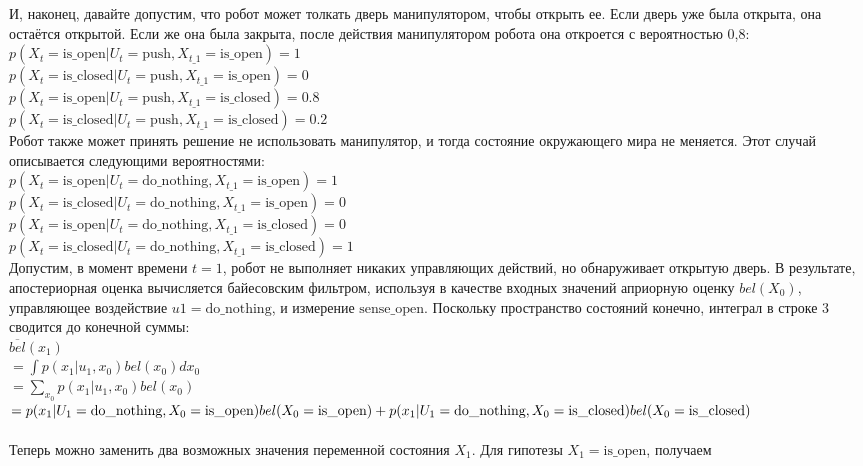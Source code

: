 \documentclass[10pt,a4paper]{article}
\begin{document}
 И, наконец, давайте допустим, что робот может толкать дверь манипулятором, чтобы открыть ее. Если дверь уже была открыта, она остаётся открытой. Если же она была закрыта, после действия манипулятором робота она откроется с вероятностью 0,8:\\
 $p(X_t =\mbox{is\_open} | U_t =\mbox{push}, X_{t\_1} =\mbox{is\_open}) = 1$\\
 $p(X_t =\mbox{is\_closed}  | U_t =\mbox{push} , X_{t\_1} =\mbox{is\_open}) = 0$\\
 $p(X_t =\mbox{is\_open}  | U_t =\mbox{push} , X_{t\_1} =\mbox{is\_closed} ) = 0.8$\\
 $p(X_t =\mbox{is\_closed}  | U_t =\mbox{push} , X_{t\_1} =\mbox{is\_closed} ) = 0.2$\\
 Робот также может принять решение не использовать манипулятор, и тогда состояние окружающего мира не меняется. Этот случай описывается следующими вероятностями:\\
 $p(X_t =\mbox{is\_open}  | U_t = \mbox{do\_nothing}, X_{t\_1} = \mbox{is\_open}) = 1$\\
 $p(X_t =\mbox{is\_closed}  | U_t =\mbox{do\_nothing} , X_{t\_1} =\mbox{is\_open} ) = 0$\\
 $p(X_t =\mbox{is\_open}  | U_t =\mbox{do\_nothing} , X_{t\_1} = \mbox{is\_closed}) = 0$\\
 $p(X_t =\mbox{is\_closed}  | U_t =\mbox{do\_nothing} , X_{t\_1} =\mbox{is\_closed} ) = 1$\\
 Допустим, в момент времени $t = 1$, робот не выполняет никаких управляющих действий, но обнаруживает открытую дверь. В результате, апостериорная оценка вычисляется байесовским фильтром, используя в качестве входных значений априорную оценку $bel(X_0)$, управляющее воздействие $u1 = \mbox{do\_nothing}$, и измерение $\mbox{sense\_open}$. Поскольку пространство состояний конечно, интеграл в строке 3 сводится до конечной суммы:\\ 
 $\overline{bel}(x_1)$\\
 $= \int p(x_1 | u_1, x_0) bel(x_0) dx_0$\\
 $=\sum_{x_0} p(x_1 | u_1, x_0) bel(x_0)$\\
 $= p(x_1 | U_1 = \mbox{do\_nothing}, X_0 =\mbox{is\_open} ) bel(X_0 =\mbox{is\_open} )\\ + p(x_1 | U_1 = \mbox{do\_nothing}, X_0 =\mbox{is\_closed} ) bel(X_0=\mbox{is\_closed})$\\
 {}\\
 Теперь можно заменить два возможных значения переменной состояния $X_1$. Для гипотезы $X_1=\mbox{is\_open}$, получаем\\
\end{document}
